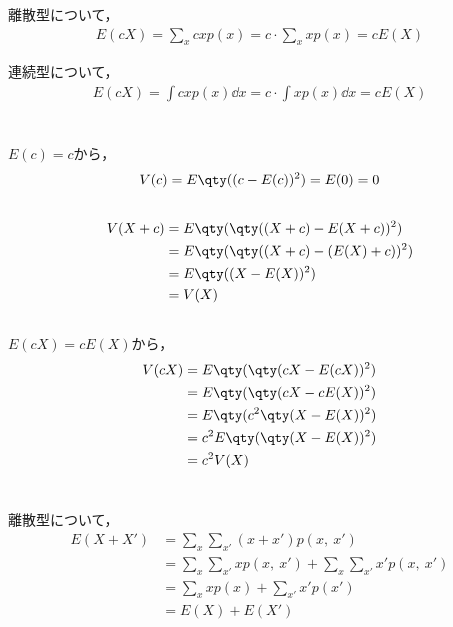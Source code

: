 \documentclass[dvipdfmx, fleqn, titlepage]{jsarticle}
\begin{document}
離散型について，
\begin{align*}
	E(cX) = \sum_x cx p(x) = c \cdot \sum_x x p(x) = c E(X)
\end{align*}

連続型について，
\begin{align*}
	E(cX) = \int cx p(x) \dd x = c \cdot \int x p(x) \dd x = c E(X)
\end{align*}



\section{}
\subsection{}
$E(c) = c$から，
\begin{align*}
	V(c) = E\qty((c - E(c))^2) = E(0) = 0
\end{align*}


\subsection{}
\begin{align*}
	V(X+c)
	& = E\qty(\qty((X+c) - E(X+c))^2) \\
	& = E\qty(\qty((X+c) - (E(X) + c))^2) \\
	& = E\qty((X - E(X))^2) \\
	& = V(X)
\end{align*}


\subsection{}
$E(cX) = cE(X)$から，
\begin{align*}
	V(cX)
	& = E\qty(\qty(cX - E(cX))^2) \\
	& = E\qty(\qty(cX - cE(X))^2) \\
	& = E\qty(c^2 \qty(X - E(X))^2) \\
	& = c^2 E\qty(\qty(X - E(X))^2) \\
	& = c^2 V(X)
\end{align*}



\section{}
\subsection{}
離散型について，
\begin{align*}
	E(X + X')
	& = \sum_x \sum_{x'} (x + x') p(x,\ x') \\
	& = \sum_x \sum_{x'} x p(x,\ x') + \sum_x \sum_{x'} x' p(x,\ x') \\
	& = \sum_x x p(x) + \sum_{x'} x' p(x') \\
	& = E(X) + E(X')
\end{align*}
\end{document}
